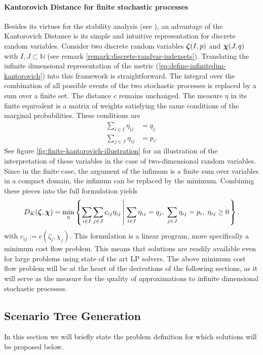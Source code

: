 \paragraph{Kantorovich Distance for finite stochastic processes}
Besides its virtues for the stability analysis (see ), an advantage of the Kantorovich Distance is its simple and intuitive representation for discrete random variables.
Consider two discrete random variables $\boldsymbol\zeta(I, p)$ and $\boldsymbol\chi(J,q)$ with $I,J\subset\mathbb{N}$ (see remark \ref{remark:discrete-randvar-indexsets}).
Translating the infinite dimensional representation of the metric (\ref{eq:define-infinitedim-kantorovich}) into this framework is straightforward.
The integral over the combination of all possible events of the two stochastic processes is replaced by a sum over a finite set.
The distance $c$ remains unchanged.
The measure $\eta$ in its finite equivalent is a matrix of weights satisfying the same conditions of the marginal probabilities.
These conditions are
\begin{align}
  \label{eq:finitedim-marginals-eta}
  \sum_{i\in I} \eta_{ij} &= q_j\\
  \sum_{j\in J} \eta_{ij} &= p_i.
\end{align}
See figure \ref{fig:finite-kantorovich-illustration} for an illustration of the interpretation of these variables in the case of two-dimensional random variables.
Since in the finite case, the argument of the infimum is a finite sum over variables in a compact domain, the infimum can be replaced by the minimum.
Combining these pieces into the full formulation yields
\begin{equation}
  \label{eq:define-finitedim-Kantorovich}
  D_K(\boldsymbol\zeta, \boldsymbol\chi) = \min\limits_{\eta}\left\{\sum_{i\in I}\sum_{j\in J}c_{ij} \eta_{ij}\left|\; \sum_{i\in I}\eta_{ij}=q_j,\;\sum_{j\in J}\eta_{ij}=p_i,\;\eta_{ij}\geq 0\right.\right\}.
\end{equation}
with $c_{ij}:=c(\zeta_i,\chi_j)$.
This formulation is a linear program, more specifically a minimum cost flow problem.
This means that solutions are readily available even for large problems using state of the art LP solvers.
The above minimum cost flow problem will be at the heart of the derivations of the following sections, as it will serve as the measure for the quality of approximations to infinite dimensional stochastic processes.

\subsection{Scenario Tree Generation}
\label{sec:scen-tree-generation}
In this section we will briefly state the problem definition for which solutions will be proposed below.

